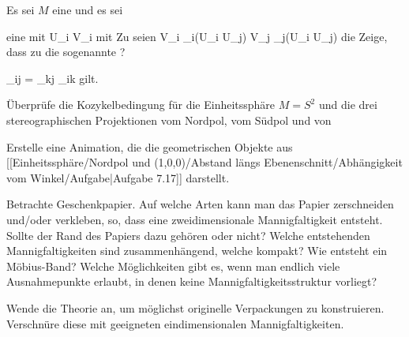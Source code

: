 {}
{

Es sei $M$ eine
und es sei

 eine
mit
 {U_i } { V_i
} {}
mit
 Zu
 seien
 {V_i \cap \alpha_i(U_i \cap U_j)  } { V_j \cap \alpha_j(U_i \cap U_j)
} {}
die
Zeige, dass zu
 die sogenannte  {}
 {?} {}

\mavergleichskettedisp
{\vergleichskette
{ \varphi_{ij}
}
{ =} {\varphi_{kj} \circ \varphi_{ik}
}
{ } {
}
{ } {
}
{ } {
}
}
{}{}{}
gilt.

}
{} {}

{}
{

Überprüfe die Kozykelbedingung
 {} {}
für die Einheitssphäre $M=S^2$ und die drei stereographischen Projektionen vom Nordpol, vom Südpol und von

}
{} {}

{}
{

Erstelle eine Animation, die die geometrischen Objekte aus
[[Einheitssphäre/Nordpol und (1,0,0)/Abstand längs Ebenenschnitt/Abhängigkeit vom Winkel/Aufgabe|Aufgabe 7.17]]
darstellt.

}
{} {}

{}
{

Betrachte Geschenkpapier. Auf welche Arten kann man das Papier zerschneiden und/oder verkleben, so, dass eine zweidimensionale Mannigfaltigkeit entsteht. Sollte der Rand des Papiers dazu gehören oder nicht? Welche entstehenden Mannigfaltigkeiten sind zusammenhängend, welche kompakt? Wie entsteht ein Möbius-Band? Welche Möglichkeiten gibt es, wenn man endlich viele Ausnahmepunkte erlaubt, in denen keine Mannigfaltigkeitsstruktur vorliegt?

Wende die Theorie an, um möglichst originelle Verpackungen zu konstruieren. Verschnüre diese mit geeigneten eindimensionalen Mannigfaltigkeiten.

}
{} {}


